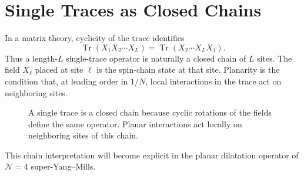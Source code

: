 \section{Single Traces as Closed Chains}

In a matrix theory, cyclicity of the trace identifies
\[
  \operatorname{Tr}(X_1X_2\cdots X_L)
  =
  \operatorname{Tr}(X_2\cdots X_LX_1).
\]
Thus a length-\(L\) single-trace operator is naturally a closed chain of
\(L\) sites.  The field \(X_\ell\) placed at site \(\ell\) is the spin-chain
state at that site.  Planarity is the condition that, at leading order in
\(1/N\), local interactions in the trace act on neighboring sites.

\begin{figure}[H]
  \centering
  \caption{A single trace is a closed chain because cyclic rotations of the
  fields define the same operator.  Planar interactions act locally on
  neighboring sites of this chain.}
  \label{fig:single-trace-closed-chain}
\end{figure}

This chain interpretation will become explicit in the planar dilatation
operator of \(\mathcal N=4\) super-Yang--Mills.
